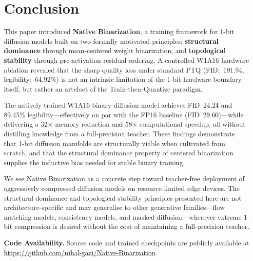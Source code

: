 \documentclass[conference]{IEEEtran}
\begin{document}
\section{Conclusion}

This paper introduced \textbf{Native Binarization}, a training framework for 1-bit
diffusion models built on two formally motivated principles: \textbf{structural
dominance} through mean-centered weight binarization, and \textbf{topological stability}
through pre-activation residual ordering. A controlled W1A16 hardware ablation revealed
that the sharp quality loss under standard PTQ (FID:~191.94, legibility:~64.92\%) is not
an intrinsic limitation of the 1-bit hardware boundary itself, but rather an artefact of
the Train-then-Quantize paradigm.

The natively trained W1A16 binary diffusion model achieves FID~24.24 and 89.45\%
legibility---effectively on par with the FP16 baseline (FID~29.60)---while delivering a
32$\times$ memory reduction and 58$\times$ computational speedup, all without
distilling knowledge from a full-precision teacher. These findings demonstrate that
1-bit diffusion manifolds are structurally viable when cultivated from scratch, and that
the structural dominance property of centered binarization supplies the inductive bias
needed for stable binary training.

We see Native Binarization as a concrete step toward teacher-free deployment of
aggressively compressed diffusion models on resource-limited edge devices. The structural
dominance and topological stability principles presented here are not architecture-specific
and may generalise to other generative families---flow matching models, consistency
models, and masked diffusion---wherever extreme 1-bit compression is desired without the
cost of maintaining a full-precision teacher.

\smallskip\noindent\textbf{Code Availability.} Source code and trained checkpoints are
publicly available at \url{https://github.com/nihal-gazi/Native-Binarization}.




\end{document}
